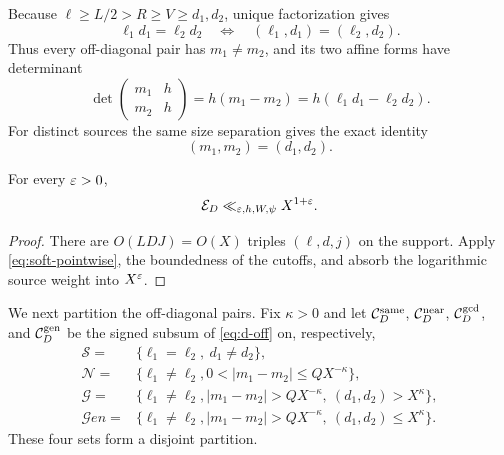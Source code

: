 Because $\ell\ge L/2>R\ge V\ge d_1,d_2$, unique factorization gives
\begin{equation}
 \ell_1d_1=\ell_2d_2
 \quad\Longleftrightarrow\quad
 (\ell_1,d_1)=(\ell_2,d_2).
 \label{eq:row-unique}
\end{equation}
Thus every off-diagonal pair has $m_1\ne m_2$, and its two affine forms
have determinant
\begin{equation}
 \boxed{\quad
 \det\begin{pmatrix}m_1&h\\m_2&h\end{pmatrix}
 =h(m_1-m_2)=h(\ell_1d_1-\ell_2d_2).
 \quad}
 \label{eq:row-determinant}
\end{equation}
For distinct sources the same size separation gives the exact identity
\begin{equation}
 (m_1,m_2)=(d_1,d_2).
 \label{eq:row-gcd}
\end{equation}

\begin{lemma}
\label{lem:d-diagonal}
For every $\varepsilon>0$,
\begin{equation}
 \mathcal E_D\ll_{\varepsilon,h,W,\psi}X^{1+\varepsilon}.
 \label{eq:d-diagonal-bound}
\end{equation}
\end{lemma}

\begin{proof}
There are $O(LDJ)=O(X)$ triples $(\ell,d,j)$ on the support.  Apply
\eqref{eq:soft-pointwise}, the boundedness of the cutoffs, and absorb
the logarithmic source weight into $X^\varepsilon$.
\end{proof}

We next partition the off-diagonal pairs.  Fix $\kappa>0$ and let
$\mathcal C_D^{\mathrm{same}}$, $\mathcal C_D^{\mathrm{near}}$,
$\mathcal C_D^{\mathrm{gcd}}$, and $\mathcal C_D^{\mathrm{gen}}$ be the signed
subsum of \eqref{eq:d-off} on, respectively,
\begin{align}
 \mathscr S={}&\{\ell_1=\ell_2,\ d_1\ne d_2\},
 \label{eq:same-set}\\
 \mathscr N={}&\{\ell_1\ne\ell_2,
 0<|m_1-m_2|\le QX^{-\kappa}\},
 \label{eq:near-set}\\
 \mathscr G={}&\{\ell_1\ne\ell_2,
 |m_1-m_2|>QX^{-\kappa},\ (d_1,d_2)>X^\kappa\},
 \label{eq:gcd-set}\\
 \mathscr G\!en={}&\{\ell_1\ne\ell_2,
 |m_1-m_2|>QX^{-\kappa},\ (d_1,d_2)\le X^\kappa\}.
 \label{eq:generic-set}
\end{align}
These four sets form a disjoint partition.

